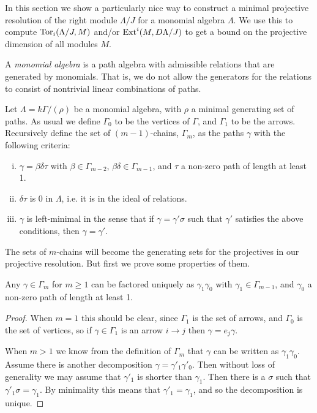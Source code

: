 \cite{GKK91, IgZa90}

In this section we show a particularly nice way to construct a minimal projective resolution of the right module $\Lambda / J$ for a monomial algebra $\Lambda$. We use this to compute $\operatorname{Tor}_i(\Lambda /J, M)$ and/or $\operatorname{Ext}^i(M, D\Lambda/J)$ to get a bound on the projective dimension of all modules $M$.

\begin{defn}
	A \emph{monomial algebra} is a path algebra with admissible relations that are generated by monomials. That is, we do not allow the generators for the relations to consist of nontrivial linear combinations of paths.
\end{defn}
\begin{defn}[$m$-chains]\cite{GKK91}
	Let $\Lambda = k\Gamma / (\rho)$ be a monomial algebra, with $\rho$ a minimal generating set of paths. As usual we define $\Gamma_0$ to be the vertices of $\Gamma$, and $\Gamma_1$ to be the arrows. Recursively define the set of $(m-1)$-chains, $\Gamma_m$, as the paths $\gamma$ with the following criteria:
	\begin{enumerate}[i)]
		\item $\gamma = \beta\delta\tau$ with $\beta \in \Gamma_{m-2}$, $\beta\delta \in \Gamma_{m-1}$, and $\tau$ a non-zero path of length at least 1.
		\item $\delta\tau$ is 0 in $\Lambda$, i.e. it is in the ideal of relations.
		\item $\gamma$ is left-minimal in the sense that if $\gamma = \gamma' \sigma$ such that $\gamma'$ satisfies the above conditions, then $\gamma = \gamma'$.
	\end{enumerate}
\end{defn}

The sets of $m$-chains will become the generating sets for the projectives in our projective resolution. But first we prove some properties of them.

\begin{lemma}\label{lem:unique_factorization_of_chains}
	Any $\gamma\in \Gamma_m$ for $m \geq 1$ can be factored uniquely as $\gamma_1\gamma_0$ with $\gamma_1 \in \Gamma_{m-1}$, and $\gamma_0$ a non-zero path of length at least 1.
	\begin{proof}
		When $m=1$ this should be clear, since $\Gamma_1$ is the set of arrows, and $\Gamma_0$ is the set of vertices, so if $\gamma \in \Gamma_1$ is an arrow $i\to j$ then $\gamma = e_j\gamma$.
		
		When $m > 1$ we know from the definition of $\Gamma_m$ that $\gamma$ can be written as $\gamma_1\gamma_0$. Assume there is another decomposition $\gamma = \gamma'_1\gamma'_0$. Then without loss of generality we may assume that $\gamma'_1$ is shorter than $\gamma_1$. Then there is a $\sigma$ such that $\gamma'_1\sigma = \gamma_1$. By minimality this means that $\gamma'_1=\gamma_1$, and so the decomposition is unique.
	\end{proof} 
\end{lemma} 

